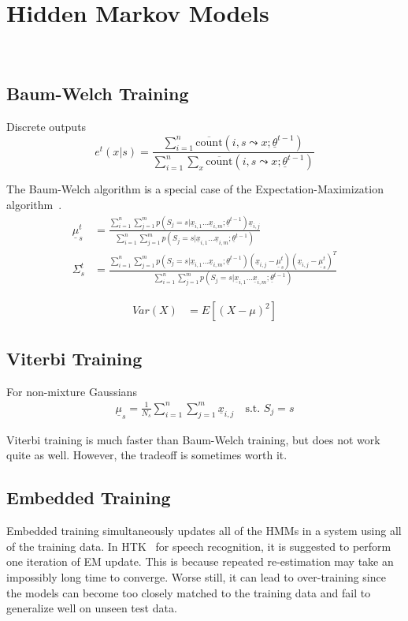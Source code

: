 \chapter{Hidden Markov Models}~\label{app:hmm}

\section{Baum-Welch Training}
Discrete outputs
\begin{equation}
e^t(x|s) = \frac{\sum_{i=1}^n \overline{\text{count}}(i, s\leadsto x;
\underline{\theta}^{t-1})}{\sum_{i=1}^n \sum_x \overline{\text{count}}(i,
s\leadsto x;
\underline{\theta}^{t-1})}
\end{equation}

The Baum-Welch algorithm is a special case of the Expectation-Maximization
algorithm~\cite{jurafsky07}.
\begin{align}
\underline{\mu}_s^t &= \frac{\sum_{i=1}^n\sum_{j=1}^m p(S_j = s |
\underline{x}_{i, 1}\ldots\underline{x}_{i,
m};\underline{\theta}^{t-1})\underline{x}_{i, j}}{\sum_{i=1}^n\sum_{j=1}^m p(S_j = s | \underline{x}_{i, 1}\ldots\underline{x}_{i, m};\underline{\theta}^{t-1})} \\
\Sigma_s^t &= \frac{\sum_{i=1}^n\sum_{j=1}^m p(S_j = s |
\underline{x}_{i, 1}\ldots\underline{x}_{i,
m};\underline{\theta}^{t-1})(\underline{x}_{i, j} -
\underline{\mu}_s^t)(\underline{x}_{i, j} -
\underline{\mu}_s^t)^T}{\sum_{i=1}^n\sum_{j=1}^m p(S_j = s | \underline{x}_{i,
1}\ldots\underline{x}_{i, m};\underline{\theta}^{t-1})}
\end{align}

\begin{eqnarray}
Var(X) &= E[(X - \mu)^2]
\end{eqnarray}

\section{Viterbi Training}
For non-mixture Gaussians
\begin{eqnarray}
\underline{\mu}_s = \frac{1}{N_s}\sum_{i=1}^n\sum_{j=1}^m\underline{x}_{i,j}
\quad \text{s.t. } S_j = s
\end{eqnarray}

Viterbi training is much faster than Baum-Welch training, but does not work
quite as well. However, the tradeoff is sometimes worth it.

\section{Embedded Training}
Embedded training simultaneously updates all of the HMMs in a system using all
of the training data. In HTK~\cite{young1994} for speech recognition, it is
suggested to perform one iteration of EM update. This is because repeated
re-estimation may take an impossibly long time to converge. Worse still, it can
lead to over-training since the models can become too closely matched to the
training data and fail to generalize well on unseen test data.

